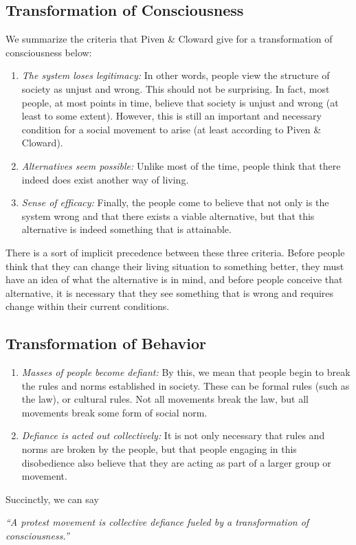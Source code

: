 \subsection{Transformation of Consciousness}
We summarize the criteria that Piven \& Cloward give for a transformation of consciousness below:
\begin{enumerate}
    \item \textit{The system loses legitimacy:}
    In other words, people view the structure of society as unjust and wrong.
    This should not be surprising.
    In fact, most people, at most points in time, believe that society is unjust and wrong (at least to some extent).
    However, this is still an important and necessary condition for a social movement to arise (at least according to Piven \& Cloward).
    \item \textit{Alternatives seem possible:}
    Unlike most of the time, people think that there indeed does exist another way of living.
    \item \textit{Sense of efficacy:}
    Finally, the people come to believe that not only is the system wrong and that there exists a viable alternative, but that this alternative is indeed something that is attainable.
\end{enumerate}
There is a sort of implicit precedence between these three criteria.
Before people think that they can change their living situation to something better, they must have an idea of what the alternative is in mind, and before people conceive that alternative, it is necessary that they see something that is wrong and requires change within their current conditions.

\subsection{Transformation of Behavior}

\begin{enumerate}
    \item \textit{Masses of people become defiant:}
    By this, we mean that people begin to break the rules and norms established in society.
    These can be formal rules (such as the law), or cultural rules.
    Not all movements break the law, but all movements break some form of social norm.
    \item \textit{Defiance is acted out collectively:}
    It is not only necessary that rules and norms are broken by the people, but that people engaging in this disobedience also believe that they are acting as part of a larger group or movement.
\end{enumerate}
Succinctly, we can say 
\begin{center}
\textit{``A protest movement is collective defiance fueled by a transformation of consciousness.''}  
\end{center}


